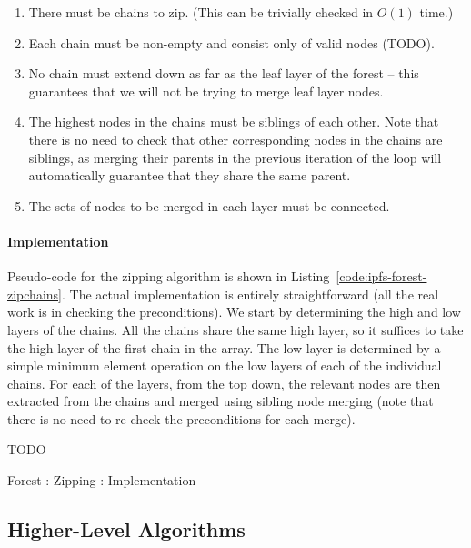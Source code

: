 \begin{enumerate}

\item There must be chains to zip. (This can be trivially checked in $O(1)$ time.)
\item Each chain must be non-empty and consist only of valid nodes (TODO).
\item No chain must extend down as far as the leaf layer of the forest -- this guarantees that we will not be trying to merge leaf layer nodes.
\item The highest nodes in the chains must be siblings of each other. Note that there is no need to check that other corresponding nodes in the chains are siblings, as merging their parents in the previous iteration of the loop will automatically guarantee that they share the same parent.
\item The sets of nodes to be merged in each layer must be connected.

\end{enumerate}

\paragraph{Implementation}

Pseudo-code for the zipping algorithm is shown in Listing~\ref{code:ipfs-forest-zipchains}. The actual implementation is entirely straightforward (all the real work is in checking the preconditions). We start by determining the high and low layers of the chains. All the chains share the same high layer, so it suffices to take the high layer of the first chain in the array. The low layer is determined by a simple minimum element operation on the low layers of each of the individual chains. For each of the layers, from the top down, the relevant nodes are then extracted from the chains and merged using sibling node merging (note that there is no need to re-check the preconditions for each merge).

TODO

\begin{stulisting}[p]
\caption{Forest : Zipping : Implementation}
\label{code:ipfs-forest-zipchains}

\end{stulisting}

\afterpage{\clearpage}
\newpage

\subsection{Higher-Level Algorithms}

